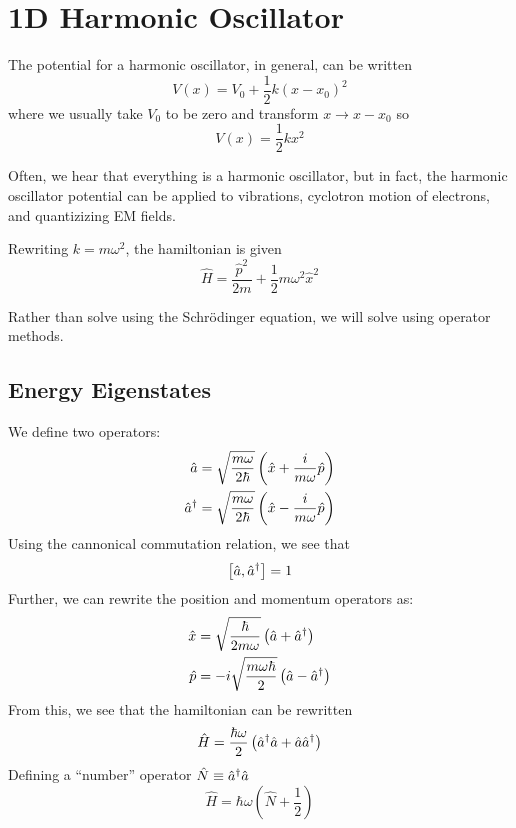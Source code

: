 \chapter{1D Harmonic Oscillator}
The potential for a harmonic oscillator, in general, can be written
\begin{equation}
	V(x)=V_0+\frac{1}{2}k(x-x_0)^2
\end{equation}
where we usually take \(V_0\) to be zero and transform \(x\to x-x_0\) so
\[V(x) = \frac{1}{2}kx^2\]

Often, we hear that everything is a harmonic oscillator, but in fact, the harmonic oscillator potential can be applied to vibrations, cyclotron motion of electrons, and quantizizing EM fields.

Rewriting \(k = m\omega^2\), the hamiltonian is given
\begin{equation}
	\hat H = \frac{\hat p^2}{2m} + \frac{1}{2}m\omega^2\hat x^2
\end{equation}

Rather than solve using the Schr\"odinger equation, we will solve using operator methods. 

\section{Energy Eigenstates}
We define two operators:
\begin{subequations}
	\begin{align}
		\hat a &= \sqrt{\frac{m\omega}{2\hbar}}\left(\hat x + \frac{i}{m\omega}\hat p\right)\\
		\hat a^{\dagger} &= \sqrt{\frac{m\omega}{2\hbar}}\left(\hat x - \frac{i}{m\omega}\hat p\right)
	\end{align}
\end{subequations}
Using the cannonical commutation relation, we see that 
\begin{equation}
	\left[\hat a, \hat a^{\dagger} \right] = 1
\end{equation}
Further, we can rewrite the position and momentum operators as:
\begin{subequations}
	\begin{align}
		\hat x & = \sqrt{\frac{\hbar}{2m\omega}}\left(\hat a + \hat a ^{\dagger} \right)\\
		\hat p & = -i\sqrt{\frac{m\omega\hbar}{2}}\left(\hat a - \hat a ^{\dagger}\right)
	\end{align}
\end{subequations}
From this, we see that the hamiltonian can be rewritten
\[\hat H = \frac{\hbar\omega}{2}\left(\hat a ^{\dagger}\hat a + \hat a \hat a^{\dagger}\right)\]
Defining a ``number'' operator \(\hat N \equiv \hat a ^{\dagger} \hat a\)
\begin{equation}
	\hat H = \hbar\omega \left(\hat{N} +\frac{1}{2}\right)
\end{equation}

